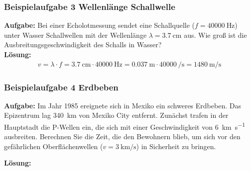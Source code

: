 \documentclass{beamer}
\begin{document}
\frame
{
\frametitle{Beispielaufgabe 3 Wellenlänge Schallwelle}
{
\textbf{Aufgabe:} Bei einer Echolotmessung sendet eine Schallquelle ($f=\SI{40000}{\hertz}$) unter Wasser Schallwellen mit der Wellenlänge $\lambda=\SI{3,7}{\centi\meter}$ aus. Wie groß ist die Ausbreitungsgeschwindigkeit des Schalls in Wasser?\\
}
{
\textbf{Lösung:}
\begin{align*}
v=\lambda\cdot f=\SI{3,7}{\centi\meter}\cdot\SI{40000}{\hertz}=\SI{0,037}{\meter}\cdot\SI{40000}{\per\second}=\SI{1480}{\meter\per\second}
\end{align*}
}
}

\frame
{
\frametitle{Beispielaufgabe 4 Erdbeben}
{
\textbf{Aufgabe:} Im Jahr 1985 ereignete sich in Mexiko ein schweres Erdbeben. Das Epizentrum lag \SI{340}{\kilo\meter} von Mexiko City entfernt. Zunächst trafen in der Hauptstadt die P-Wellen ein, die sich mit einer Geschwindigkeit von \SI{6}{\kilo\meter\per\second} ausbreiten. Berechnen Sie die Zeit, die den Bewohnern blieb, um sich vor den gefährlichen Oberflächenwellen ($v=\SI{3}{\kilo\meter\per\second}$) in Sicherheit zu bringen.\\
}

{
\textbf{Lösung:}
}
}
\end{document}
